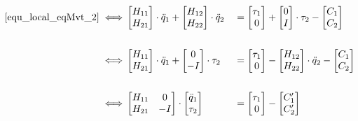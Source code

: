 \documentclass{report}
\begin{document}
\begin{alignat}{2}
\eqref{equ_local_eqMvt_2} \iff
&\begin{bmatrix}
  H_{11} \\
  H_{21}
\end{bmatrix} 
\cdot \ddot{q}_1
+
\begin{bmatrix}
  H_{12} \\
  H_{22}
\end{bmatrix}
\cdot \ddot{q}_2
&&=
\begin{bmatrix}
  \tau_1 \\
  0
\end{bmatrix} 
+
\begin{bmatrix}
  0 \\
  I
\end{bmatrix} 
\cdot \tau_2
-
\begin{bmatrix}
  C_{1} \\
  C_{2}
\end{bmatrix} \notag \\
\notag \\
\iff
&\begin{bmatrix}
  H_{11} \\
  H_{21}
\end{bmatrix} 
\cdot \ddot{q}_1
+
\begin{bmatrix}
  0 \\
  -I
\end{bmatrix} 
\cdot \tau_2
&&=
\begin{bmatrix}
  \tau_1 \\
  0
\end{bmatrix} 
-
\begin{bmatrix}
  H_{12} \\
  H_{22}
\end{bmatrix}
\cdot \ddot{q}_2
-
\begin{bmatrix}
  C_{1} \\
  C_{2}
\end{bmatrix} \label{equ_equationMvt_dynHyb1} \\
\notag \\
\iff
&\begin{bmatrix}
  H_{11} & 0 \\
  H_{21} &  -I
\end{bmatrix} 
\cdot
\begin{bmatrix}
  \ddot{q}_1 \\
  \tau_2
\end{bmatrix} 
&&=
\begin{bmatrix}
  \tau_1 \\
  0
\end{bmatrix} 
-
\begin{bmatrix}
  C'_{1} \\
  C'_{2}
\end{bmatrix} \label{equ_equationMvt_dynHyb2}
\end{alignat}
\end{document}
